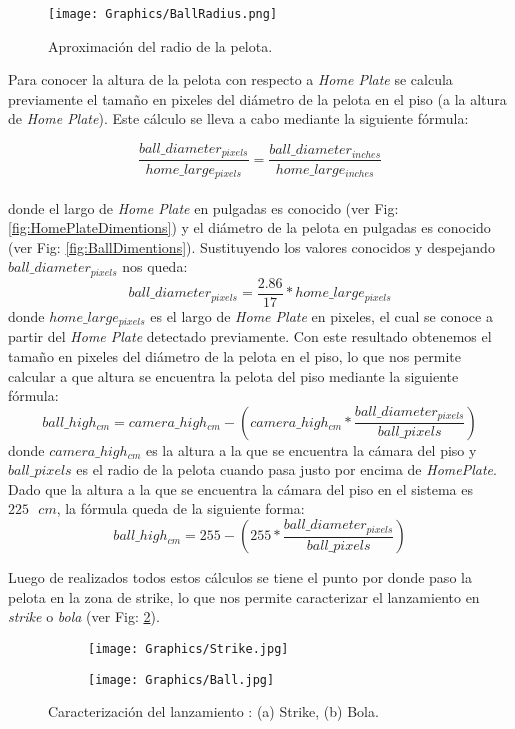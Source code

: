 \begin{figure}[!h]
    \centering
    \texttt{[image: Graphics/BallRadius.png]}
    \caption{Aproximación del radio de la pelota.}
    \label{fig:BallRadius}
\end{figure}

Para conocer la altura de la pelota con respecto a \textit{Home Plate} se calcula previamente el tamaño en pixeles del diámetro de la pelota en el piso (a la altura de \textit{Home Plate}). Este cálculo se lleva a cabo mediante la siguiente fórmula:

$$\frac{ball\_diameter_{pixels}}{home\_large_{pixels}} = \frac{ball\_diameter_{inches}}{home\_large_{inches}}$$\\
donde el largo de \textit{Home Plate} en pulgadas es conocido (ver Fig: \ref{fig:HomePlateDimentions}) y el diámetro de la pelota en pulgadas es conocido (ver Fig: \ref{fig:BallDimentions}). Sustituyendo los valores conocidos y despejando $ball\_diameter_{pixels}$ nos queda:
$$ball\_diameter_{pixels} = \frac{2.86}{17}*home\_large_{pixels}$$
donde $home\_large_{pixels}$ es el largo de \textit{Home Plate} en pixeles, el cual se conoce a partir del \textit{Home Plate} detectado previamente. Con este resultado obtenemos el tamaño en pixeles del diámetro de la pelota en el piso, lo que nos permite calcular a que altura se encuentra la pelota del piso mediante la siguiente fórmula:
$$ball\_high_{cm} = camera\_high_{cm} - (camera\_high_{cm}*\frac{ball\_diameter_{pixels}}{ball\_pixels})$$
donde $camera\_high_{cm}$ es la altura a la que se encuentra la cámara del piso y $ball\_pixels$ es el radio de la pelota cuando pasa justo por encima de \textit{HomePlate}. Dado que la altura a la que se encuentra la cámara del piso en el sistema es $225\text{ }cm$, la fórmula queda de la siguiente forma:
$$ball\_high_{cm} = 255 - (255*\frac{ball\_diameter_{pixels}}{ball\_pixels})$$

Luego de realizados todos estos cálculos se tiene el punto por donde paso la pelota en la zona de strike, lo que nos permite caracterizar el lanzamiento en \textit{strike} o \textit{bola} (ver Fig: \ref{fig:PitchCall}).

\begin{figure}[!h]
	\centering
	\begin{subfigure}[b]{0.45\linewidth}
		\texttt{[image: Graphics/Strike.jpg]}
		\caption{}
	\end{subfigure}
	\begin{subfigure}[b]{0.45\linewidth}
		\texttt{[image: Graphics/Ball.jpg]}
		\caption{}
	\end{subfigure}
	\caption{Caracterización del lanzamiento : (a) Strike, (b) Bola.}
	\label{fig:PitchCall}
\end{figure}

